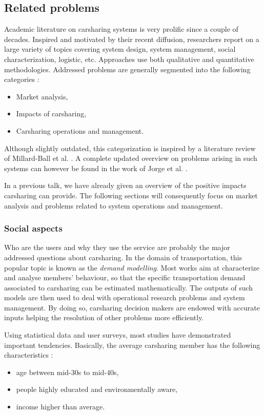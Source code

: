 \begin{bibunit}[ieeetr]
\newpage
\subsection{Related problems}

Academic literature on carsharing systems is very prolific since a couple of decades.
Inspired and motivated by their recent diffusion, researchers report on a large variety of topics covering system design, system management, social characterization, logistic, etc.
Approaches use both qualitative and quantitative methodologies.
Addressed problems are generally segmented into the following categories \cite{ciari_sharing_2012}:
\begin{itemize}
\item Market analysis,
\item Impacts of carsharing,
\item Carsharing operations and management.
\end{itemize}

Although slightly outdated, this categorization is inspired by a literature review of Millard-Ball et al. \cite{millard_ball_car_sharing_2005}.
A complete updated overview on problems arising in such systems can however be found in the work of Jorge et al. \cite{jorge_carsharing_2013}.

\medskip
In a previous talk, we have already given an overview of the positive impacts carsharing can provide.
The following sections will consequently focus on market analysis and problems related to system operations and management.


\subsubsection{Social aspects}
Who are the users and why they use the service are probably the major addressed questions about carsharing.
In the domain of transportation, this popular topic is known as the \emph{demand modelling}.
Most works aim at characterize and analyse members' behaviour, so that the specific transportation demand associated to carsharing can be estimated mathematically.
The outputs of such models are then used to deal with operational research problems and system management.
By doing so, carsharing decision makers are endowed with accurate inputs helping the resolution of other problems more efficiently.

\medskip
Using statistical data and user surveys, most studies have demonstrated important tendencies.
Basically, the average carsharing member has the following characteristics \cite{brook_carsharingstart_2004, millard_ball_car_sharing_2005, lane_phillycarshare_2005, zheng_carsharing_2009, costain_synopsis_2012, efthymiou_which_2012}:
\begin{itemize}
\item age between mid-30s to mid-40s,
\item people highly educated and environmentally aware,
\item income higher than average.
\end{itemize}


\end{bibunit}
